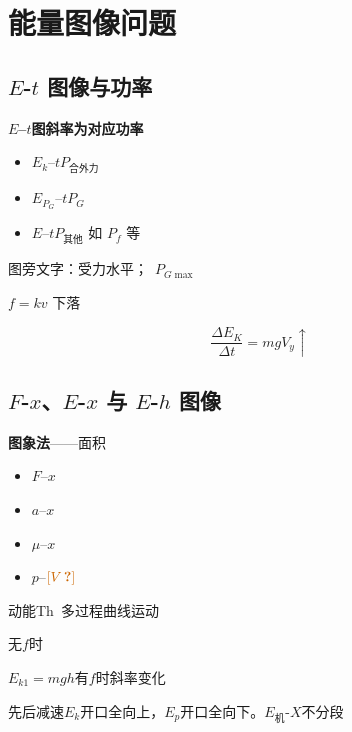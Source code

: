 \section{能量图像问题}
\subsection{$E$-$t$ 图像与功率}
\textbf{$E$--$t$图斜率为对应功率}
\begin{itemize}
\item $E_k$--$t$\quad $P_{\text{合外力}}$
\item $E_{P_G}$--$t$\quad $P_G$
\item $E$--$t$\quad $P_{\text{其他}}$ 如 $P_f$ 等
\end{itemize}
图旁文字：受力水平；\ $P_{G\max}$

$f=kv$ 下落


\begin{problem}
\begin{solution}
\[ \frac{\Delta E_K}{\Delta t}=mgV_y\uparrow \]
\end{solution}
\end{problem}

\subsection{$F$-$x$、$E$-$x$ 与 $E$-$h$ 图像}
\textbf{图象法}——面积
\begin{itemize}
\item $F$--$x$
\item $a$--$x$
\item $\mu$--$x$
\item $p$--$\unclear{V}$
\end{itemize}
动能Th\ 多过程曲线运动

无$f$时

$E_{k1}=mgh$\qquad\qquad 有$f$时\quad 斜率变化

先后减速\qquad $E_k$开口全向上，$E_p$开口全向下。$E_{\text{机}}$-$X$不分段 %

